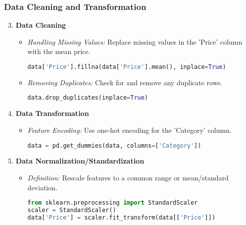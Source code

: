 \documentclass[aspectratio=169]{beamer}
\begin{document}
\begin{frame}[fragile]
    \frametitle{Data Cleaning and Transformation}
    \begin{enumerate}
        \setcounter{enumi}{2}
        \item \textbf{Data Cleaning}
        \begin{itemize}
            \item \textit{Handling Missing Values:} Replace missing values in the 'Price' column with the mean price.
            \begin{lstlisting}[language=Python]
data['Price'].fillna(data['Price'].mean(), inplace=True)
            \end{lstlisting}

            \item \textit{Removing Duplicates:} Check for and remove any duplicate rows.
            \begin{lstlisting}[language=Python]
data.drop_duplicates(inplace=True)
            \end{lstlisting}
        \end{itemize}

        \item \textbf{Data Transformation}
        \begin{itemize}
            \item \textit{Feature Encoding:} Use one-hot encoding for the 'Category' column.
            \begin{lstlisting}[language=Python]
data = pd.get_dummies(data, columns=['Category'])
            \end{lstlisting}
        \end{itemize}

        \item \textbf{Data Normalization/Standardization}
        \begin{itemize}
            \item \textit{Definition:} Rescale features to a common range or mean/standard deviation.
            \begin{lstlisting}[language=Python]
from sklearn.preprocessing import StandardScaler
scaler = StandardScaler()
data['Price'] = scaler.fit_transform(data[['Price']])
            \end{lstlisting}
        \end{itemize}
    \end{enumerate}
\end{frame}
\end{document}
